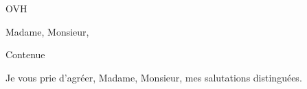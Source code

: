 \documentclass[a4paper, 10pt]{lettre}
\makeatletter
\newcommand*{\NoRule}{\renewcommand*{\rule@length}{0}}
\makeatother
\begin{document}
 
\begin{letter}{OVH}
\NoRule %
 
\def\concname{Object :~} %
\conc{} %

\opening{Madame, Monsieur,}
 

Contenue 
 
\closing{Je vous prie d'agréer,
Madame, Monsieur,
mes salutations distinguées.}

\end{letter}
 
\end{document}
